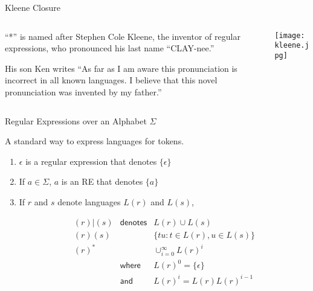 \documentclass{plt}
\begin{document}
\begin{frame}{Kleene Closure}

\begin{columns}
\begin{column}{0.65\textwidth}
\raggedright

``*'' is named after Stephen Cole Kleene, the inventor of regular
expressions, who pronounced his last name ``CLAY-nee.''

\medskip

His son Ken writes ``As far as I am aware this pronunciation is incorrect
in all known languages. I believe that this novel pronunciation was
invented by my father.''
\end{column}
\begin{column}{0.45\textwidth}
\texttt{[image: kleene.jpg]}
\end{column}
\end{columns}

\end{frame}

\begin{frame}{Regular Expressions over an Alphabet $\Sigma$}

A standard way to express languages for tokens.

\begin{enumerate}

\item $\epsilon$ is a regular expression that denotes $\{\epsilon\}$

\item If $a \in \Sigma$, $a$ is an RE that denotes $\{a\}$

\item If $r$ and $s$ denote languages $L(r)$ and $L(s)$,

\[
\begin{array}{lll}
(r)|(s) &\textsf{denotes}& L(r) \cup L(s) \\[10pt]
(r)(s) && \{ tu : t \in L(r), u \in L(s) \} \\[10pt]
(r)^* && \cup_{i=0}^{\infty} L(r)^i \\
& \textsf{where} & L(r)^0 = \{\epsilon\}\ \\
& \textsf{and} & L(r)^i = L(r) L(r)^{i-1} \\
\end{array}
\]

\end{enumerate}

\end{frame}
\end{document}
